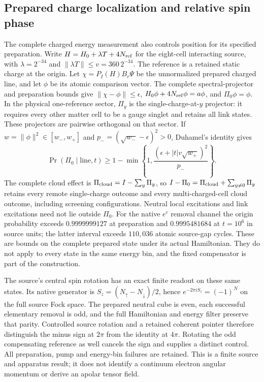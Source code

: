\subsection{Prepared charge localization and relative spin phase}

The complete charged energy measurement also controls position for its
specified preparation.  Write $H=H_0+\lambda T+4N_{\rm ref}$ for the
eight-cell interacting source, with $\lambda=2^{-34}$ and
$\|\lambda T\|\leq v=360\,2^{-34}$.  The reference is a retained static
charge at the origin.  Let $\chi=P_I(H)B_r\Psi$ be the unnormalized
prepared charged line, and let $\phi$ be its atomic comparison vector.
The complete spectral-projector and preparation bounds give
$\|\chi-\phi\|\leq\epsilon$, $H_0\phi+4N_{\rm ref}\phi=a\phi$,
and $\Pi_0\phi=\phi$.  In the physical one-reference sector, $\Pi_y$
is the single-charge-at-$y$ projector: it requires every other matter cell
to be a gauge singlet and retains all link states.  These projectors are
pairwise orthogonal on that sector.  If $w=\|\phi\|^2\in[w_-,w_+]$ and
$p_-=(\sqrt{w_-}-\epsilon)^2>0$, Duhamel's identity gives
\[
 \Pr(\Pi_0\mid\text{line},t)\geq
 1-\min\left\{1,
 \frac{(\epsilon+|t|v\sqrt{w_+})^2}{p_-}\right\}.
\]
The complete cloud effect is $\Pi_{\rm cloud}=I-\sum_y\Pi_y$, so
$I-\Pi_0=\Pi_{\rm cloud}+\sum_{y\ne0}\Pi_y$ retains every remote
single-charge outcome and every multi-charged-cell cloud outcome,
including screening configurations.  Neutral local excitations and link
excitations need not lie outside $\Pi_0$.  For the native $e^c$ removal channel the
origin probability exceeds $0.9999999127$ at preparation and
$0.9995481684$ at $t=10^6$ in source units; the latter interval exceeds
$110{,}036$ atomic source-gap cycles.  These are bounds on the complete
prepared state under its actual Hamiltonian.  They do not apply to every
state in the same energy bin, and the fixed compensator is part of the
construction.

The source's central spin rotation has an exact finite readout on these
same states.  Its native generator is
$S_z=(N_\uparrow-N_\downarrow)/2$, hence
$e^{-2\pi i S_z}=(-1)^N$ on the full source Fock space.  The prepared
neutral cube is even, each successful elementary removal is odd, and
the full Hamiltonian and energy filter preserve that parity.  Controlled
source rotation and a retained coherent pointer therefore distinguish
the minus sign at $2\pi$ from the identity at $4\pi$.  Rotating the odd
compensating reference as well cancels the sign and supplies a distinct
control.  All preparation, pump and energy-bin failures are retained.
This is a finite source and apparatus result; it does not identify a
continuum electron angular momentum or derive an apolar tensor field.

